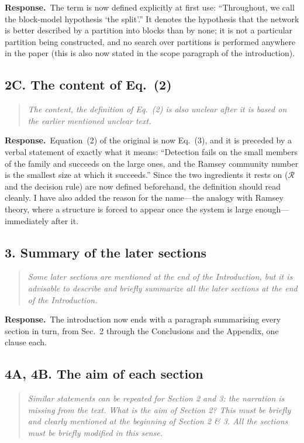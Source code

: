 \documentclass[11pt]{article}
\newcommand{\Rev}{\mathcal{R}}
\newenvironment{point}{\begin{quote}\itshape}{\end{quote}}
\newcommand{\reply}{\par\noindent\textbf{Response.}\ }
\begin{document}
\reply The term is now defined explicitly at first use: ``Throughout, we call
the block-model hypothesis `the split'.'' It denotes the hypothesis that the
network is better described by a partition into blocks than by none; it is not
a particular partition being constructed, and no search over partitions is
performed anywhere in the paper (this is also now stated in the scope paragraph
of the introduction).

\subsection*{2C. The content of Eq.~(2)}

\begin{point}
The content, the definition of Eq.~(2) is also unclear after it is based on the
earlier mentioned unclear text.
\end{point}

\reply Equation~(2) of the original is now Eq.~(3), and it is preceded by a
verbal statement of exactly what it means: ``Detection fails on the small
members of the family and succeeds on the large ones, and the Ramsey community
number is the smallest size at which it succeeds.'' Since the two ingredients
it rests on ($\Rev$ and the decision rule) are now defined beforehand, the
definition should read cleanly. I have also added the reason for the name---the
analogy with Ramsey theory, where a structure is forced to appear once the
system is large enough---immediately after it.

\subsection*{3. Summary of the later sections}

\begin{point}
Some later sections are mentioned at the end of the Introduction, but it is
advisable to describe and briefly summarize all the later sections at the end
of the Introduction.
\end{point}

\reply The introduction now ends with a paragraph summarising every section in
turn, from Sec.~2 through the Conclusions and the Appendix, one clause each.

\subsection*{4A, 4B. The aim of each section}

\begin{point}
Similar statements can be repeated for Section 2 and 3: the narration is
missing from the text. What is the aim of Section 2? This must be briefly and
clearly mentioned at the beginning of Section 2 \& 3. All the sections must be
briefly modified in this sense.
\end{point}
\end{document}
